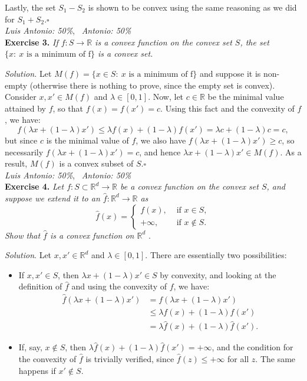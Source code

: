 \documentclass[12pt]{article}
\newcommand*{\QED}{\null\nobreak\hfill\ensuremath{\square}}%
\begin{document}
Lastly, the set \( S_1 - S_2 \) is shown to be convex using the same reasoning as we did for $S_1+S_2$.\QED\\

\textit{Luis Antonio: 50\%}, \ \textit{Antonio: 50\%}\\
\textbf{Exercise 3. }\emph{If \( f: S \to \mathbb{R} \) is a convex function on the convex set \( S \), the set \( \{x : \ x \text{ is a minimum of f} \} \) is a convex set.}

\emph{Solution.} Let \( M(f) = \{x \in S: \ x \text{ is a minimum of f} \} \) and suppose it is non-empty (otherwise there is nothing to prove, since the empty set is convex). Consider \( x, x' \in M(f) \) and \( \lambda \in [0,1] \). Now, let  $c\in \mathbb R$ be the minimal value attained by $f$, so that $f(x)=f(x')=c$. Using this fact and the convexity of $f$, we have:
\[
    f(\lambda x + (1-\lambda)x') \leq \lambda f(x) + (1-\lambda)f(x') = \lambda c + (1-\lambda)c = c,
\]
but since $c$ is the minimal value of $f$, we also have $f(\lambda x + (1-\lambda)x') \geq c$, so necessarily $f(\lambda x + (1-\lambda)x')=c$, and hence $\lambda x + (1-\lambda)x' \in M(f)$. As a result, \( M(f) \) is a convex subset of \( S \).\QED\\

\textit{Luis Antonio: 50\%}, \ \textit{Antonio: 50\%}\\
\textbf{Exercise 4. }\emph{Let \( f : S \subset \mathbb{R}^d  \to \mathbb{R}\) be a convex function on the convex set \( S \), and suppose we extend it to an \( \hat{f}:\mathbb{R}^d \to \mathbb{R}\) as  }
\[
    \hat{f}(x) = \begin{cases}
        f(x), &\text{ if } x \in S,\\
        +\infty, &\text{ if } x \notin S.
    \end{cases}
\]
\emph{Show that \( \hat{f} \) is a convex function on \( \mathbb{R}^d \) }.

\emph{Solution}. Let \( x, x' \in \mathbb{R}^d \) and \( \lambda \in [0,1] \). There are essentially two possibilities:
\begin{itemize}
    \item If \( x,x' \in S \), then $\lambda x + (1-\lambda)x' \in S$ by convexity, and looking at the definition of $\hat f$ and using the convexity of $f$, we have:
     \begin{align*}\hat{f}(\lambda x + (1-\lambda)x') &= f(\lambda x + (1-\lambda)x')\\
       &\leq \lambda f(x) + (1-\lambda) f(x')\\
        &= \lambda \hat f(x) + (1-\lambda)\hat f(x'). \end{align*}
    \item If, say, \( x \notin S \), then \( \lambda \hat{f}(x) + (1-\lambda)\hat{f}(x') =+\infty \), and the condition for the convexity of $\hat f$ is trivially verified, since $\hat f(z) \leq +\infty$ for all $z$. The same happens if \( x' \notin S \).
\end{itemize}
\end{document}
